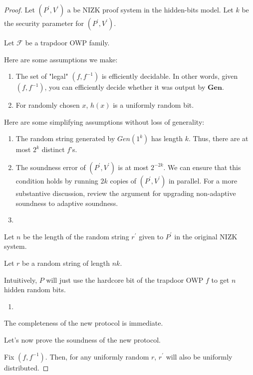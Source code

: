 \documentclass{article}
\theoremstyle{definition}
\newcommand{\Gen}{\textbf{Gen}}
\begin{document}
\begin{proof}
    Let $(P^{\prime}, V^{\prime})$ a be NIZK proof system in the hidden-bits model.
    Let $k$ be the security parameter for $(P^{\prime}, V^{\prime})$.

    Let $\mathcal{F}$ be a trapdoor OWP family.

    Here are some assumptions we make:

    \begin{enumerate}
        \item The set of "legal" $(f,f^{-1})$ is efficiently decidable. In other words, given $(f,f^{-1})$, you can
        efficiently decide whether it was output by $\Gen$.
        \item For randomly chosen $x$, $h(x)$ is a uniformly random bit.
    \end{enumerate}

    Here are some simplifying assumptions without loss of generality:

    \begin{enumerate}
        \item The random string generated by $Gen(1^{k})$ has length $k$. Thus, there are at most $2^{k}$
        distinct $f$'s.
        \item The soundness error of $(P^{\prime}, V^{\prime})$ is at most $2^{-2k}$. We can ensure that this condition
        holds by running $2k$ copies of $(P^{\prime}, V^{\prime})$ in parallel. For a more substantive discussion, review the
        argument for upgrading non-adaptive soundness to adaptive soundness.
        \item 
    \end{enumerate}

    Let $n$ be the length of the random string $r^{\prime}$ given to $P^{\prime}$ in the original NIZK system.

    Let $r$ be a random string of length $nk$.

    Intuitively, $P$ will just use the hardcore bit of the trapdoor OWP $f$ to get $n$ hidden random bits.

    \begin{enumerate}
        \item 
    \end{enumerate} 

    The completeness of the new protocol is immediate.

    Let's now prove the soundness of the new protocol.
    
    Fix $(f,f^{-1})$. Then, for any uniformly random $r$, $r^{\prime}$ will also be uniformly distributed.


\end{proof}
\end{document}
